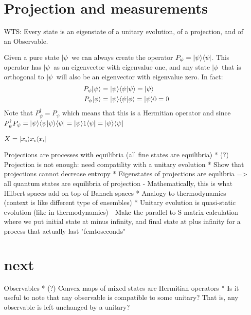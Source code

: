 \section{Projection and measurements}


WTS: Every state is an eigenstate of a unitary evolution, of a projection, and of an Observable.

Given a pure state $|\psi \>$ we can always create the operator $P_{\psi}=|\psi \rangle \langle\psi|$. This operator has $|\psi\>$ as an eigenvector with eigenvalue one, and any state $|\phi\>$ that is orthogonal to $|\psi\>$ will also be an eigenvector with eigenvalue zero. In fact:
\begin{equation}
	\begin{aligned}
		P_{\psi} | \psi \rangle &= |\psi \rangle \langle\psi|\psi\rangle = |\psi \rangle \\
		P_{\psi} | \phi \rangle &= |\psi \rangle \langle\psi|\phi\rangle = |\psi \rangle 0 = 0 \\
	\end{aligned}
\end{equation}
Note that $P_{\psi}^\dagger = P_{\psi}$ which means that this is a Hermitian operator and since  $P_{\psi}^\dagger P_{\psi}  = |\psi \rangle \langle\psi|\psi\rangle \langle\psi| = |\psi \rangle 1 \langle\psi| = |\psi \rangle \langle\psi|$

$X = |x_i\rangle x_i \langle x_i|$


Projections are processes with equilibria (all fine states are equilibria)
* (?) Projection is not enough: need compatility with a unitary evolution
* Show that projections cannot decrease entropy
* Eigenstates of projections are equlibria => all quantum states are equilibria of projection
  - Mathematically, this is what Hilbert spaces add on top of Banach spaces
* Analogy to thermodynamics (context is like different type of ensembles)
* Unitary evolution is quasi-static evolution (like in thermodynamics)
  - Make the parallel to S-matrix calculation where we put initial state at minus infinity, and final state at plus infinity for a process that actually last "femtoseconds"
  
\section{next}

Observables
* (?) Convex maps of mixed states are Hermitian operators
* Is it useful to note that any observable is compatible to some unitary? That is, any observable is left unchanged by a unitary?

